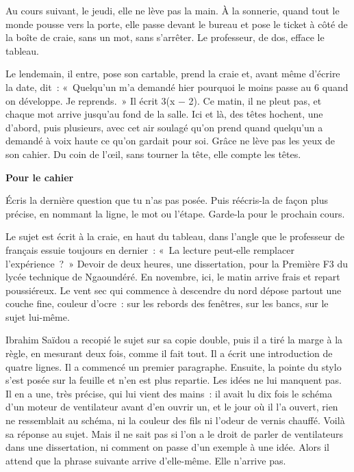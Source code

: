 \documentclass[10.5pt,twoside,openright]{book}
\newenvironment{pourcahier}[1]{\par\vspace{0.9em}\begin{tcolorbox}[colback=black!4,colframe=accent,boxrule=0pt,leftrule=2.2pt,arc=0pt,left=8pt,right=8pt,top=5pt,bottom=5pt]\small\textbf{#1}\par\smallskip}{\end{tcolorbox}\par}
\newcommand{\chapitre}[2]{\cleardoublepage\markright{#2}\thispagestyle{plain}\vspace*{2.2cm}{\noindent\color{accent}\fontsize{54}{54}\selectfont\bfseries #1}\par\vspace{0.5em}{\noindent\LARGE\bfseries #2\par}\vspace{1.6em}\noindent\ignorespaces}
\begin{document}
Au cours suivant, le jeudi, elle ne lève pas la main. À la sonnerie, quand tout le monde pousse vers la porte, elle passe devant le bureau et pose le ticket à côté de la boîte de craie, sans un mot, sans s’arrêter. Le professeur, de dos, efface le tableau.

Le lendemain, il entre, pose son cartable, prend la craie et, avant même d’écrire la date, dit : « Quelqu’un m’a demandé hier pourquoi le moins passe au 6 quand on développe. Je reprends. » Il écrit 3(x − 2). Ce matin, il ne pleut pas, et chaque mot arrive jusqu’au fond de la salle. Ici et là, des têtes hochent, une d’abord, puis plusieurs, avec cet air soulagé qu’on prend quand quelqu’un a demandé à voix haute ce qu’on gardait pour soi. Grâce ne lève pas les yeux de son cahier. Du coin de l’œil, sans tourner la tête, elle compte les têtes.

\begin{pourcahier}{Pour le cahier}
Écris la dernière question que tu n’as pas posée. Puis réécris-la de façon plus précise, en nommant la ligne, le mot ou l’étape. Garde-la pour le prochain cours.
\end{pourcahier}


\chapitre{4}{Le cahier du voisin}

Le sujet est écrit à la craie, en haut du tableau, dans l’angle que le professeur de français essuie toujours en dernier : « La lecture peut-elle remplacer l’expérience ? » Devoir de deux heures, une dissertation, pour la Première F3 du lycée technique de Ngaoundéré. En novembre, ici, le matin arrive frais et repart poussiéreux. Le vent sec qui commence à descendre du nord dépose partout une couche fine, couleur d’ocre : sur les rebords des fenêtres, sur les bancs, sur le sujet lui-même.

Ibrahim Saïdou a recopié le sujet sur sa copie double, puis il a tiré la marge à la règle, en mesurant deux fois, comme il fait tout. Il a écrit une introduction de quatre lignes. Il a commencé un premier paragraphe. Ensuite, la pointe du stylo s’est posée sur la feuille et n’en est plus repartie. Les idées ne lui manquent pas. Il en a une, très précise, qui lui vient des mains : il avait lu dix fois le schéma d’un moteur de ventilateur avant d’en ouvrir un, et le jour où il l’a ouvert, rien ne ressemblait au schéma, ni la couleur des fils ni l’odeur de vernis chauffé. Voilà sa réponse au sujet. Mais il ne sait pas si l’on a le droit de parler de ventilateurs dans une dissertation, ni comment on passe d’un exemple à une idée. Alors il attend que la phrase suivante arrive d’elle-même. Elle n’arrive pas.
\end{document}
